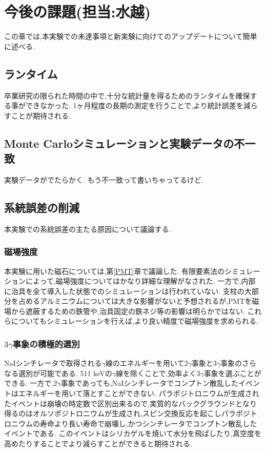 \chapter{今後の課題(担当:水越)}\label{prospect}

この章では,本実験での未達事項と新実験に向けてのアップデートについて簡単に述べる.

\section{ランタイム}
卒業研究の限られた時間の中で,十分な統計量を得るためのランタイムを確保する事ができなかった.
1ヶ月程度の長期の測定を行うことで,より統計誤差を減らすことが期待される.

\section{Monte Carloシミュレーションと実験データの不一致}
実験データがでたらかく.
もう不一致って書いちゃってるけど.

\section{系統誤差の削減}
本実験での系統誤差の主たる原因について議論する.

\subsection{磁場強度}
本実験に用いた磁石については,第\ref{PMT}章で議論した.
有限要素法のシミュレーションによって,磁場強度についてはかなり詳細な理解がなされた.
一方で,内部に治具を全て導入した状態でのシミュレーションは行われていない.
支柱の大部分を占めるアルミニウムについては大きな影響がないと予想されるが,PMTを磁場から遮蔽するための鉄管や,治具固定の鉄ネジ等の影響は明らかではない.
これらについてもシミュレーションを行えば,より良い精度で磁場強度を求められる.

\subsection{$3\gamma$事象の積極的選別}
NaIシンチレータで取得される$\gamma$線のエネルギーを用いて$2\gamma$事象と$3\gamma$事象のさらなる選別が可能である.
511 keVの$\gamma$線を除くことで,効率よく$3\gamma$事象を選ぶことができる.
一方で,$2\gamma$事象であっても,NaIシンチレータでコンプトン散乱したイベントはエネルギーを用いて落とすことができない.
パラポジトロニウムが生成されたイベントは崩壊の時定数で区別出来るので,実質的なバックグラウンドとなり得るのはオルソポジトロニウムが生成され,スピン交換反応を起こしパラポジトロニウムの寿命より長い寿命で崩壊し,かつシンチレータでコンプトン散乱したイベントである.
このイベントはシリカゲルを焼いて水分を飛ばしたり,真空度を高めたりすることでより減らすことができると期待される.


